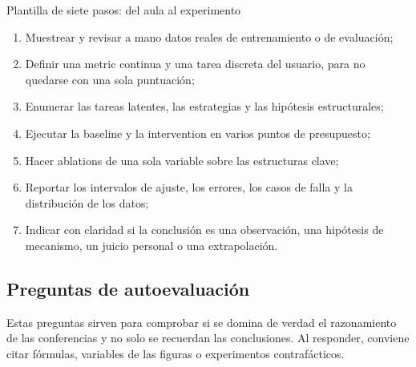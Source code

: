 \documentclass[a4paper]{article}
\begin{document}
\begin{importantbox}{Plantilla de siete pasos: del aula al experimento}
\begin{enumerate}
  \item Muestrear y revisar a mano datos reales de entrenamiento o de evaluación;
  \item Definir una metric continua y una tarea discreta del usuario, para no quedarse con una sola puntuación;
  \item Enumerar las tareas latentes, las estrategias y las hipótesis estructurales;
  \item Ejecutar la baseline y la intervention en varios puntos de presupuesto;
  \item Hacer ablations de una sola variable sobre las estructuras clave;
  \item Reportar los intervalos de ajuste, los errores, los casos de falla y la distribución de los datos;
  \item Indicar con claridad si la conclusión es una observación, una hipótesis de mecanismo, un juicio personal o una extrapolación.
\end{enumerate}
\end{importantbox}

\subsection{Preguntas de autoevaluación}

Estas preguntas sirven para comprobar si se domina de verdad el razonamiento de las conferencias y no solo se recuerdan las conclusiones. Al responder, conviene citar fórmulas, variables de las figuras o experimentos contrafácticos.
\end{document}
